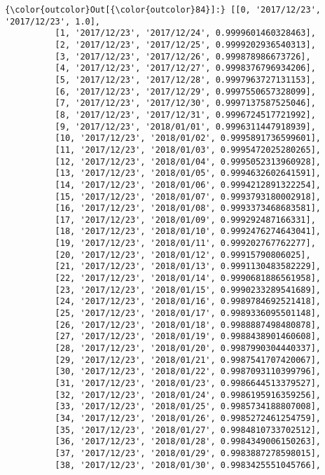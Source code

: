\documentclass[11pt]{article}
\begin{document}
\begin{Verbatim}[commandchars=\\\{\}]
{\color{outcolor}Out[{\color{outcolor}84}]:} [[0, '2017/12/23', '2017/12/23', 1.0],
          [1, '2017/12/23', '2017/12/24', 0.9999601460328463],
          [2, '2017/12/23', '2017/12/25', 0.9999202936540313],
          [3, '2017/12/23', '2017/12/26', 0.999878986673726],
          [4, '2017/12/23', '2017/12/27', 0.9998376796934206],
          [5, '2017/12/23', '2017/12/28', 0.9997963727131153],
          [6, '2017/12/23', '2017/12/29', 0.9997550657328099],
          [7, '2017/12/23', '2017/12/30', 0.9997137587525046],
          [8, '2017/12/23', '2017/12/31', 0.9996724517721992],
          [9, '2017/12/23', '2018/01/01', 0.9996311447918939],
          [10, '2017/12/23', '2018/01/02', 0.9995891736599601],
          [11, '2017/12/23', '2018/01/03', 0.9995472025280265],
          [12, '2017/12/23', '2018/01/04', 0.9995052313960928],
          [13, '2017/12/23', '2018/01/05', 0.9994632602641591],
          [14, '2017/12/23', '2018/01/06', 0.9994212891322254],
          [15, '2017/12/23', '2018/01/07', 0.9993793180002918],
          [16, '2017/12/23', '2018/01/08', 0.9993373468683581],
          [17, '2017/12/23', '2018/01/09', 0.999292487166331],
          [18, '2017/12/23', '2018/01/10', 0.9992476274643041],
          [19, '2017/12/23', '2018/01/11', 0.999202767762277],
          [20, '2017/12/23', '2018/01/12', 0.99915790806025],
          [21, '2017/12/23', '2018/01/13', 0.9991130483582229],
          [22, '2017/12/23', '2018/01/14', 0.9990681886561958],
          [23, '2017/12/23', '2018/01/15', 0.9990233289541689],
          [24, '2017/12/23', '2018/01/16', 0.9989784692521418],
          [25, '2017/12/23', '2018/01/17', 0.9989336095501148],
          [26, '2017/12/23', '2018/01/18', 0.9988887498480878],
          [27, '2017/12/23', '2018/01/19', 0.9988438901460608],
          [28, '2017/12/23', '2018/01/20', 0.9987990304440337],
          [29, '2017/12/23', '2018/01/21', 0.9987541707420067],
          [30, '2017/12/23', '2018/01/22', 0.9987093110399796],
          [31, '2017/12/23', '2018/01/23', 0.9986644513379527],
          [32, '2017/12/23', '2018/01/24', 0.9986195916359256],
          [33, '2017/12/23', '2018/01/25', 0.9985734188807008],
          [34, '2017/12/23', '2018/01/26', 0.9985272461254759],
          [35, '2017/12/23', '2018/01/27', 0.9984810733702512],
          [36, '2017/12/23', '2018/01/28', 0.9984349006150263],
          [37, '2017/12/23', '2018/01/29', 0.9983887278598015],
          [38, '2017/12/23', '2018/01/30', 0.9983425551045766],

\end{Verbatim}
\end{document}
